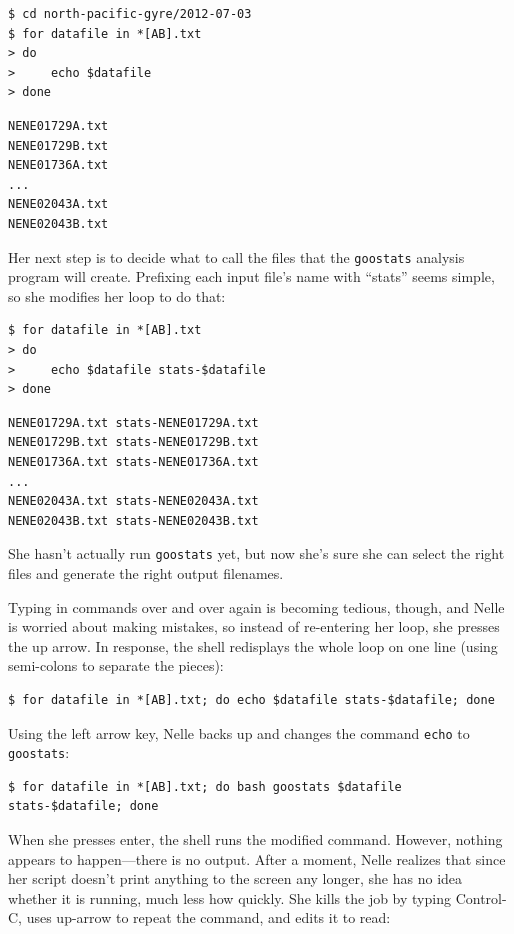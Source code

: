 \documentclass{book}
\begin{document}
\begin{verbatim}
$ cd north-pacific-gyre/2012-07-03
$ for datafile in *[AB].txt
> do
>     echo $datafile
> done
\end{verbatim}

\begin{verbatim}
NENE01729A.txt
NENE01729B.txt
NENE01736A.txt
...
NENE02043A.txt
NENE02043B.txt
\end{verbatim}

Her next step is to decide what to call the files that the
\texttt{goostats} analysis program will create. Prefixing each input
file's name with ``stats'' seems simple, so she modifies her loop to do
that:

\begin{verbatim}
$ for datafile in *[AB].txt
> do
>     echo $datafile stats-$datafile
> done
\end{verbatim}

\begin{verbatim}
NENE01729A.txt stats-NENE01729A.txt
NENE01729B.txt stats-NENE01729B.txt
NENE01736A.txt stats-NENE01736A.txt
...
NENE02043A.txt stats-NENE02043A.txt
NENE02043B.txt stats-NENE02043B.txt
\end{verbatim}

She hasn't actually run \texttt{goostats} yet, but now she's sure she
can select the right files and generate the right output filenames.

Typing in commands over and over again is becoming tedious, though, and
Nelle is worried about making mistakes, so instead of re-entering her
loop, she presses the up arrow. In response, the shell redisplays the
whole loop on one line (using semi-colons to separate the pieces):

\begin{verbatim}
$ for datafile in *[AB].txt; do echo $datafile stats-$datafile; done
\end{verbatim}

Using the left arrow key, Nelle backs up and changes the command
\texttt{echo} to \texttt{goostats}:

\begin{verbatim}
$ for datafile in *[AB].txt; do bash goostats $datafile stats-$datafile; done
\end{verbatim}

When she presses enter, the shell runs the modified command. However,
nothing appears to happen---there is no output. After a moment, Nelle
realizes that since her script doesn't print anything to the screen any
longer, she has no idea whether it is running, much less how quickly.
She kills the job by typing Control-C, uses up-arrow to repeat the
command, and edits it to read:
\end{document}
